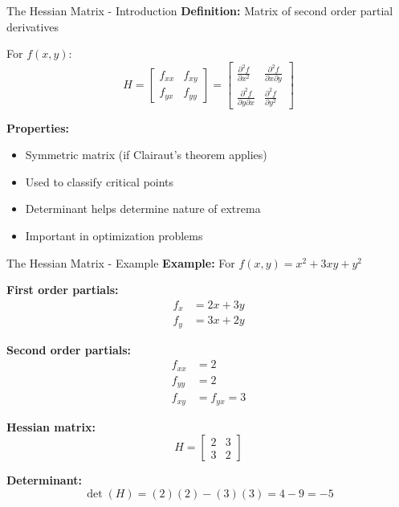 \documentclass[aspectratio=169]{beamer}
\begin{document}
\begin{frame}{The Hessian Matrix - Introduction}
\textbf{Definition:} Matrix of second order partial derivatives

For $f(x,y)$:
\[H = \begin{bmatrix} 
f_{xx} & f_{xy} \\
f_{yx} & f_{yy}
\end{bmatrix} = \begin{bmatrix} 
\frac{\partial^2 f}{\partial x^2} & \frac{\partial^2 f}{\partial x \partial y} \\
\frac{\partial^2 f}{\partial y \partial x} & \frac{\partial^2 f}{\partial y^2}
\end{bmatrix}\]

\textbf{Properties:}
\begin{itemize}
    \item Symmetric matrix (if Clairaut's theorem applies)
    \item Used to classify critical points
    \item Determinant helps determine nature of extrema
    \item Important in optimization problems
\end{itemize}
\end{frame}

\begin{frame}{The Hessian Matrix - Example}
\textbf{Example:} For $f(x,y) = x^2 + 3xy + y^2$

\textbf{First order partials:}
\begin{align*}
    f_x &= 2x + 3y \\
    f_y &= 3x + 2y
\end{align*}

\textbf{Second order partials:}
\begin{align*}
    f_{xx} &= 2 \\
    f_{yy} &= 2 \\
    f_{xy} &= f_{yx} = 3
\end{align*}

\textbf{Hessian matrix:}
\[H = \begin{bmatrix} 
2 & 3 \\
3 & 2
\end{bmatrix}\]

\textbf{Determinant:}
\[\det(H) = (2)(2) - (3)(3) = 4 - 9 = -5\]
\end{frame}
\end{document}
